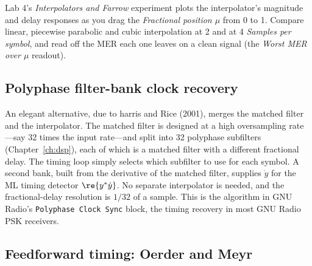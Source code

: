 
\begin{tryit}
Lab 4's \emph{Interpolators and Farrow} experiment plots the interpolator's magnitude and delay
responses as you drag the \emph{Fractional position $\mu$} from 0 to 1. Compare linear, piecewise
parabolic and cubic interpolation at 2 and at 4 \emph{Samples per symbol}, and read off the MER each
one leaves on a clean signal (the \emph{Worst MER over $\mu$} readout).
\end{tryit}


\subsection{Polyphase filter-bank clock recovery}

An elegant alternative, due to harris and Rice (2001), merges the matched filter and the interpolator.
The matched filter is designed at a high oversampling rate---say 32 times the input rate---and split
into 32 polyphase subfilters (Chapter~\ref{ch:dsp}), each of which is a matched filter with a different
fractional delay. The timing loop simply selects which subfilter to use for each symbol. A second
bank, built from the derivative of the matched filter, supplies $\dot y$ for the ML timing
detector $\re\{y^*\dot y\}$. No separate interpolator is needed, and the fractional-delay resolution
is $1/32$ of a sample. This is the algorithm in GNU Radio's \texttt{Polyphase Clock Sync} block,
the timing recovery in most GNU Radio PSK receivers.

\subsection{Feedforward timing: Oerder and Meyr}

